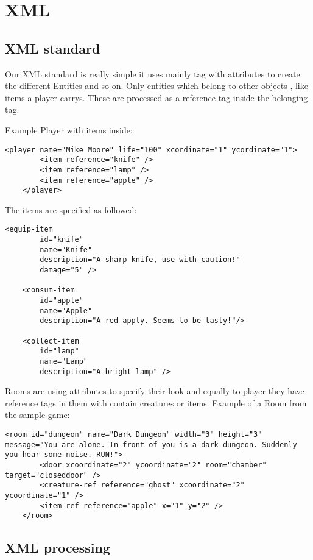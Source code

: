 \chapter{XML}

\section{XML standard}
Our XML standard is really simple it uses mainly tag with attributes to create the different Entities and so on. Only entities which belong to other objects , like items a player carrys. These are processed as a reference tag inside the belonging tag.

Example Player with items inside:
\lstset{language=XML}
\begin{lstlisting}
<player name="Mike Moore" life="100" xcordinate="1" ycordinate="1">
        <item reference="knife" />
        <item reference="lamp" />
        <item reference="apple" />
    </player>
\end{lstlisting}
The items are specified as followed:
\lstset{language=XML}
\begin{lstlisting}
<equip-item
        id="knife"
        name="Knife"
        description="A sharp knife, use with caution!"
        damage="5" />

    <consum-item
        id="apple"
        name="Apple"
        description="A red apply. Seems to be tasty!"/>

    <collect-item
        id="lamp"
        name="Lamp"
        description="A bright lamp" />
\end{lstlisting}

Rooms are using attributes to specify their look and equally to player they have reference tags in them with contain creatures or items.
Example of a Room from the sample game:
\lstset{language=XML}
\begin{lstlisting}
<room id="dungeon" name="Dark Dungeon" width="3" height="3" message="You are alone. In front of you is a dark dungeon. Suddenly you hear some noise. RUN!">
        <door xcoordinate="2" ycoordinate="2" room="chamber" target="closeddoor" />
        <creature-ref reference="ghost" xcoordinate="2" ycoordinate="1" />
        <item-ref reference="apple" x="1" y="2" />
    </room>

\end{lstlisting}


        


\section{XML processing}